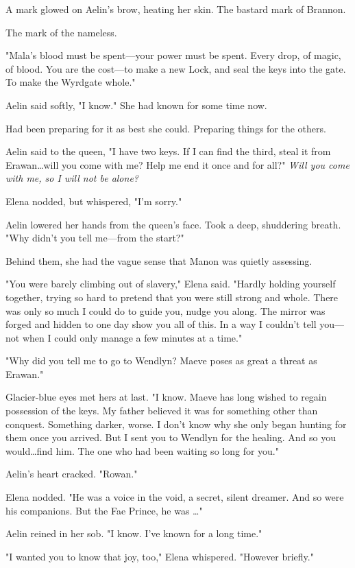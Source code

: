 A mark glowed on Aelin's brow, heating her skin.
The bastard mark of Brannon.

The mark of the nameless.

"Mala's blood must be spent---your power must be spent.
Every drop, of magic, of blood.
You are the cost---to make a new Lock, and seal the keys into the gate.
To make the Wyrdgate whole."

Aelin said softly, "I know."
She had known for some time now.

Had been preparing for it as best she could.
Preparing things for the others.

Aelin said to the queen, "I have two keys.
If I can find the third, steal it from Erawan\ldots will you come with me?
Help me end it once and for all?"
\emph{Will you come with me, so I will not be alone?}

Elena nodded, but whispered, "I'm sorry."

Aelin lowered her hands from the queen's face.
Took a deep, shuddering breath.
"Why didn't you tell me---from the start?"

Behind them, she had the vague sense that Manon was quietly assessing.

"You were barely climbing out of slavery," Elena said.
"Hardly holding yourself together, trying so hard to pretend that you were still strong and whole.
There was only so much I could do to guide you, nudge you along.
The mirror was forged and hidden to one day show you all of this.
In a way I couldn't tell you---not when I could only manage a few minutes at a time."

"Why did you tell me to go to Wendlyn?
Maeve poses as great a threat as Erawan."

Glacier-blue eyes met hers at last.
"I know.
Maeve has long wished to regain possession of the keys.
My father believed it was for something other than conquest.
Something darker, worse.
I don't know why she only began hunting for them once you arrived.
But I sent you to Wendlyn for the healing.
And so you would\ldots find him.
The one who had been waiting so long for you."

Aelin's heart cracked.
"Rowan."

Elena nodded.
"He was a voice in the void, a secret, silent dreamer.
And so were his companions.
But the Fae Prince, he was \ldots"

Aelin reined in her sob.
"I know.
I've known for a long time."

"I wanted you to know that joy, too," Elena whispered.
"However briefly."

